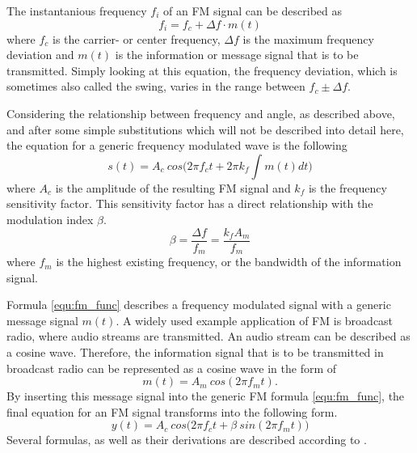 The instantanious frequency $f_i$ of an FM signal can be described as
\begin{equation}
  f_i = f_c + \Delta f \cdot m(t)
\end{equation}
where $f_c$ is the carrier- or center frequency, $\Delta f$ is the maximum frequency deviation and $m(t)$ is the information or message signal that is to be transmitted.
Simply looking at this equation, the frequency deviation, which is sometimes also called the swing, varies in the range between $f_c \pm \Delta f$.

Considering the relationship between frequency and angle, as described above, and after some simple substitutions which will not be described into detail here, the equation for a generic frequency modulated wave is the following
\begin{equation}
  s(t) = A_c\ cos \Big( 2 \pi f_c t + 2 \pi k_f \int m(t) dt \Big)
  \label{equ:fm_func}
\end{equation}
where $A_c$ is the amplitude of the resulting FM signal and $k_f$ is the frequency sensitivity factor.
This sensitivity factor has a direct relationship with the modulation index $\beta$.
\begin{equation}
  \beta = \frac{\Delta f}{f_m} = \frac{k_f A_m}{f_m}
\end{equation}
where $f_m$ is the highest existing frequency, or the bandwidth of the information signal.

Formula \eqref{equ:fm_func} describes a frequency modulated signal with a generic message signal $m(t)$.
A widely used example application of FM is broadcast radio, where audio streams are transmitted.
An audio stream can be described as a cosine wave.
Therefore, the information signal that is to be transmitted in broadcast radio can be represented as a cosine wave in the form of
\begin{equation}
  m(t) = A_m\ cos(2 \pi f_m t).
\end{equation}
By inserting this message signal into the generic FM formula \eqref{equ:fm_func}, the final equation for an FM signal transforms into the following form.
\begin{equation}
  y(t) = A_c\ cos \Big(2 \pi f_c t + \beta\ sin(2 \pi f_m t)\Big )
\end{equation}
Several formulas, as well as their derivations are described according to \cite[pg.54-55]{MatinMohammadA2018CSfE}.

